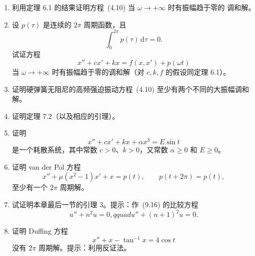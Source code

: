 \begin{enumerate}
  \[
    x''+x^3=\varepsilon\cos\omega t
  \]
  当 $\varepsilon$ 充分小时有 $2\pi/\omega$ 周期解。
  \item 利用定理 6.1 的结果证明方程~(4.10) 当 $\omega\to+\infty$ 时有振幅趋于零的
  调和解。
  \item 设 $p(\tau)$ 是连续的 $2\pi$ 周期函数，且
  \[
    \int_0^{2\pi}p(\tau)\,\mathrm d\tau=0.
  \]
  试证方程
  \[
    x''+cx'+kx=f(x,x')+p(\omega t)
  \]
  当 $\omega\to+\infty$ 时有振幅趋于零的调和解（对 $c,k,f$ 的假设同定理 6.1）。
  \item 证明硬弹簧无阻尼的高频强迫振动方程~(4.10) 至少有两个不同的大振幅调和解。
  \item 证明定理 7.2（以及相应的引理）。
  \item 证明
  \[
    x''+cx'+kx+\alpha x^3=E\sin t
  \]
  是一个耗散系统，其中常数 $c>0$、$k>0$，又常数 $\alpha\geq0$ 和 $E\geq0$。
  \item 证明 van der Pol 方程
  \[
    x''+\mu(x^2-1)x'+x=p(t),\qquad p(t+2\pi)=p(t),
  \]
  至少有一个 $2\pi$ 周期解。
  \item 试证明本章最后一节的引理 3。提示：作~(9.16) 的比较方程
  \[
    u''+n^2u=0,qquad u''+(n+1)^2u=0.
  \]
  \item 证明 Duffing 方程
  \[
    x''+x-\tan^{-1}x=4\cos t
  \]
  没有 $2\pi$ 周期解。提示：利用反证法。
\end{enumerate}

